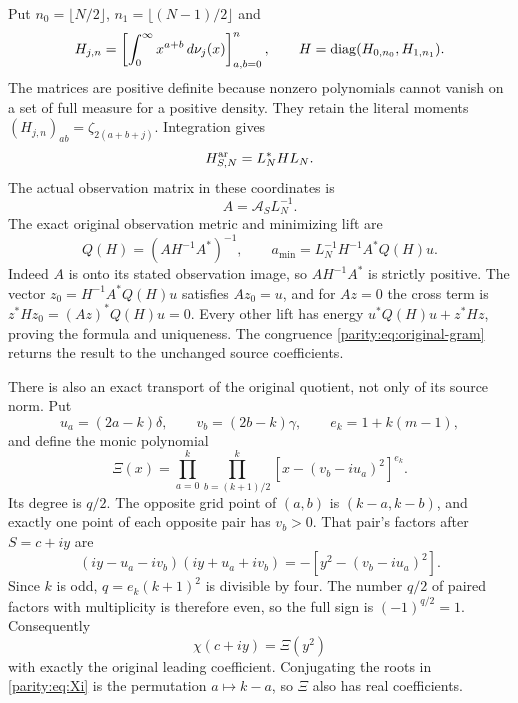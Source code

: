 \documentclass[11pt]{article}
\begin{document}
Put $n_0=\lfloor N/2\rfloor$, $n_1=\lfloor(N-1)/2\rfloor$ and
\begin{equation}\label{parity:eq:parity-grams}
 H_{j,n}=\left[\int_0^\infty x^{a+b}\,d\nu_j(x)\right]_{a,b=0}^n,
 \qquad H=\operatorname{diag}(H_{0,n_0},H_{1,n_1}).
\end{equation}
The matrices are positive definite because nonzero polynomials
cannot vanish on a set of full measure for a positive density.
They retain the literal moments
$(H_{j,n})_{ab}=\zeta_{2(a+b+j)}$. Integration gives
\begin{equation}\label{parity:eq:original-gram}
 H_{S,N}^{\rm ar}=L_N^*HL_N.
\end{equation}
The actual observation matrix in these coordinates is
\begin{equation}\label{parity:eq:observation}
A=\mathcal A_SL_N^{-1}.
\end{equation}
The exact original observation metric and minimizing lift are
\begin{equation}\label{parity:eq:Q}
 Q(H)=(AH^{-1}A^*)^{-1},\qquad
 a_{\min}=L_N^{-1}H^{-1}A^*Q(H)u.
\end{equation}
Indeed $A$ is onto its stated observation image, so $AH^{-1}A^*$
is strictly positive. The vector $z_0=H^{-1}A^*Q(H)u$ satisfies
$Az_0=u$, and for $Az=0$ the cross term is
$z^*Hz_0=(Az)^*Q(H)u=0$. Every other lift has energy
$u^*Q(H)u+z^*Hz$, proving the formula and uniqueness. The
congruence \eqref{parity:eq:original-gram} returns the result to the
unchanged source coefficients.

There is also an exact transport of the original quotient, not
only of its source norm. Put
\[
 u_a=(2a-k)\delta,\qquad v_b=(2b-k)\gamma,\qquad
 e_k=1+k(m-1),
\]
and define the monic polynomial
\begin{equation}\label{parity:eq:Xi}
 \Xi(x)=\prod_{a=0}^k\prod_{b=(k+1)/2}^{k}
                 [x-(v_b-iu_a)^2]^{e_k}.
\end{equation}
Its degree is $q/2$. The opposite grid point of $(a,b)$ is
$(k-a,k-b)$, and exactly one point of each opposite pair has
$v_b>0$. That pair's factors after $S=c+iy$ are
\[
 (iy-u_a-iv_b)(iy+u_a+iv_b)
          =-[y^2-(v_b-iu_a)^2].
\]
Since $k$ is odd, $q=e_k(k+1)^2$ is divisible by four. The number
$q/2$ of paired factors with multiplicity is therefore even,
so the full sign is $(-1)^{q/2}=1$. Consequently
\begin{equation}\label{parity:eq:chi-square}
 \chi(c+iy)=\Xi(y^2)
\end{equation}
with exactly the original leading coefficient. Conjugating the
roots in \eqref{parity:eq:Xi} is the permutation $a\mapsto k-a$, so
$\Xi$ also has real coefficients.
\end{document}
